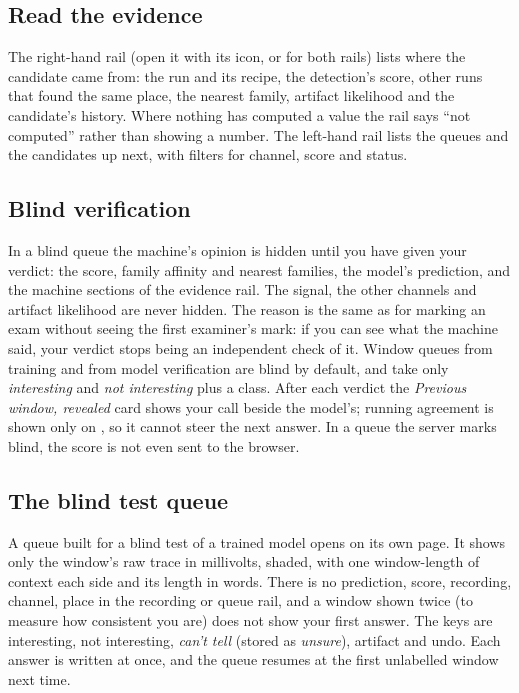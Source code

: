 \subsection{Read the evidence}\label{sec:review-evidence}
The right-hand rail (open it with its icon, or \ui{\textbackslash} for both rails) lists where the
candidate came from: the run and its recipe, the detection's score, other runs that found
the same place, the nearest family, artifact likelihood and the candidate's history. Where
nothing has computed a value the rail says ``not computed'' rather than showing a number.
The left-hand rail lists the queues and the candidates up next, with filters for channel,
score and status.


\subsection{Blind verification}\label{sec:review-blind}
In a blind queue the machine's opinion is hidden until you have given your verdict: the
score, family affinity and nearest families, the model's prediction, and the machine
sections of the evidence rail. The signal, the other channels and artifact likelihood are
never hidden. The reason is the same as for marking an exam without seeing the first
examiner's mark: if you can see what the machine said, your verdict stops being an
independent check of it. Window queues from training and from model verification are blind
by default, and take only \emph{interesting} and \emph{not interesting} plus a class. After
each verdict the \emph{Previous window, revealed} card shows your call beside the model's;
running agreement is shown only on , so it cannot steer the next
answer. In a queue the server marks blind, the score is not even sent to the browser.


\subsection{The blind test queue}\label{sec:review-blind-test}
A queue built for a blind test of a trained model opens on its own page. It shows only the
window's raw trace in millivolts, shaded, with one window-length of context each side and its
length in words. There is no prediction, score, recording, channel, place in the recording
or queue rail, and a window shown twice (to measure how consistent you are) does not show
your first answer. The keys are  interesting,  not interesting, 
\emph{can't tell} (stored as \emph{unsure}),  artifact and  undo. Each answer is
written at once, and the queue resumes at the first unlabelled window next time.

